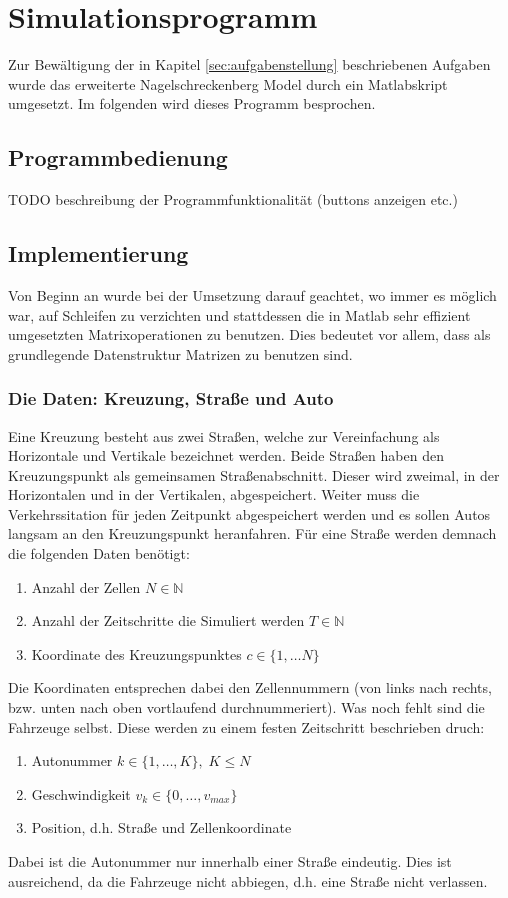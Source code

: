 \chapter{Simulationsprogramm}
Zur Bewältigung der in Kapitel \ref{sec:aufgabenstellung} beschriebenen
Aufgaben wurde das erweiterte Nagelschreckenberg Model 
durch ein Matlabskript umgesetzt. Im folgenden wird dieses
Programm besprochen.

\section{Programmbedienung}
TODO beschreibung der Programmfunktionalität (buttons anzeigen etc.)

\section{Implementierung}
Von Beginn an wurde bei der Umsetzung darauf geachtet, wo immer es möglich 
war, auf Schleifen zu verzichten und stattdessen die in Matlab sehr effizient 
umgesetzten Matrixoperationen zu benutzen. Dies bedeutet vor allem, dass als 
grundlegende Datenstruktur Matrizen zu benutzen sind. 

\subsection{Die Daten: Kreuzung, Straße und Auto}
Eine Kreuzung besteht aus zwei Straßen, welche zur Vereinfachung als Horizontale und Vertikale
bezeichnet werden. Beide Straßen haben den Kreuzungspunkt als gemeinsamen Straßenabschnitt. Dieser
wird zweimal, in der Horizontalen und in der Vertikalen, abgespeichert. 
Weiter muss die Verkehrssitation für jeden Zeitpunkt abgespeichert werden und
es sollen Autos langsam an den Kreuzungspunkt heranfahren. 
Für eine Straße werden demnach die folgenden Daten benötigt:
\begin{enumerate}
  \item Anzahl der Zellen \(N \in \mathbb{N}\)
  \item Anzahl der Zeitschritte die Simuliert werden \(T \in \mathbb{N}\)
  \item Koordinate des Kreuzungspunktes \(c \in \{ 1, \ldots N \}\)
\end{enumerate}
Die Koordinaten entsprechen dabei den Zellennummern (von links nach rechts, bzw. unten nach oben vortlaufend durchnummeriert). Was noch fehlt sind die Fahrzeuge selbst. Diese werden zu einem festen Zeitschritt beschrieben druch:
\begin{enumerate}
  \item Autonummer \(k \in \{ 1, \ldots, K \}, \; K \leq N\) 
  \item Geschwindigkeit \(v_k \in \{0, \ldots, v_{max} \}\)
  \item Position, d.h. Straße und Zellenkoordinate
\end{enumerate}
Dabei ist die Autonummer nur innerhalb einer Straße eindeutig. Dies ist ausreichend, da die Fahrzeuge nicht 
abbiegen, d.h. eine Straße nicht verlassen.

